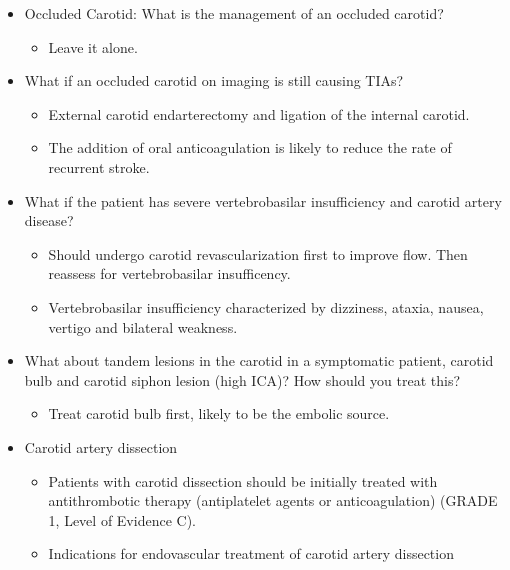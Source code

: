 \documentclass[
]{book}
\providecommand{\tightlist}{%
  \setlength{\itemsep}{0pt}\setlength{\parskip}{0pt}}
\begin{document}
\begin{itemize}
\item
  Occluded Carotid: What is the management of an occluded carotid?

  \begin{itemize}
  \tightlist
  \item
    Leave it alone.
  \end{itemize}
\item
  What if an occluded carotid on imaging is still causing TIAs?

  \begin{itemize}
  \item
    External carotid endarterectomy and ligation of the internal
    carotid.
  \item
    The addition of oral anticoagulation is likely to reduce the
    rate of recurrent stroke.
  \end{itemize}
\item
  What if the patient has severe vertebrobasilar insufficiency and
  carotid artery disease?

  \begin{itemize}
  \tightlist
  \item
    Should undergo carotid revascularization first to improve flow.
    Then reassess for vertebrobasilar insufficency.
  \item
    Vertebrobasilar insufficiency characterized by dizziness,
    ataxia, nausea, vertigo and bilateral weakness.
    \citep{limanetoPathophysiologyDiagnosisVertebrobasilar2017}
  \end{itemize}
\item
  What about tandem lesions in the carotid in a symptomatic patient,
  carotid bulb and carotid siphon lesion (high ICA)? How should you
  treat this?

  \begin{itemize}
  \tightlist
  \item
    Treat carotid bulb first, likely to be the embolic source.
  \end{itemize}
\item
  Carotid artery dissection

  \begin{itemize}
  \item
    Patients with carotid dissection should be initially treated
    with antithrombotic therapy (antiplatelet agents or
    anticoagulation) (GRADE 1, Level of Evidence C).
  \item
    Indications for endovascular treatment of carotid artery
    dissection \citep{cohenSinglecenterExperienceEndovascular2012, markusAntiplateletTherapyVs2019a, phamEndovascularStentingExtracranial2011}


\end{itemize}
\end{itemize}
\end{document}
